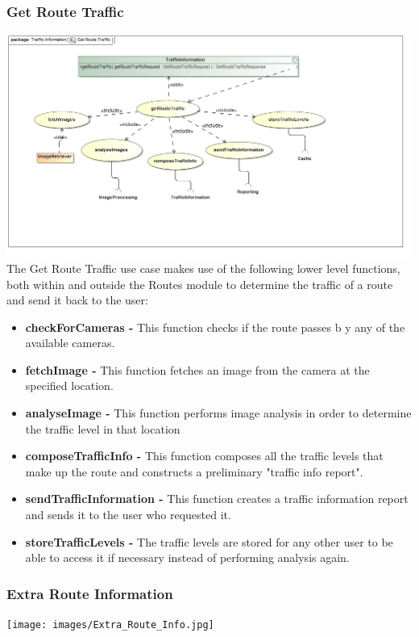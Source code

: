 \documentclass[a4paper,12pt]{article}
\begin{document}
\subsubsection{Get Route Traffic}
\includegraphics[width=\textwidth]{images/Get_Route_Traffic.jpg}
The Get Route Traffic use case makes use of the following lower level functions, both within and outside the Routes module to determine the traffic of a route and send it back to the user:
\begin{itemize}
\item \textbf{checkForCameras -} This function checks if the route passes b y any of the available cameras.
\item \textbf{fetchImage -} This function fetches an image from the camera at the specified location.
\item \textbf{analyseImage -} This function performs image analysis in order to determine the traffic level in that location
\item \textbf{composeTrafficInfo -} This function composes all the traffic levels that make up the route and constructs a preliminary "traffic info report".
\item \textbf{sendTrafficInformation -} This function creates a traffic information report and sends it to the user who requested it.
\item \textbf{storeTrafficLevels -} The traffic levels are stored for any other user to be able to access it if necessary instead of performing analysis again.
\end{itemize}

\subsubsection{Extra Route Information}
\texttt{[image: images/Extra\_Route\_Info.jpg]}
\end{document}
